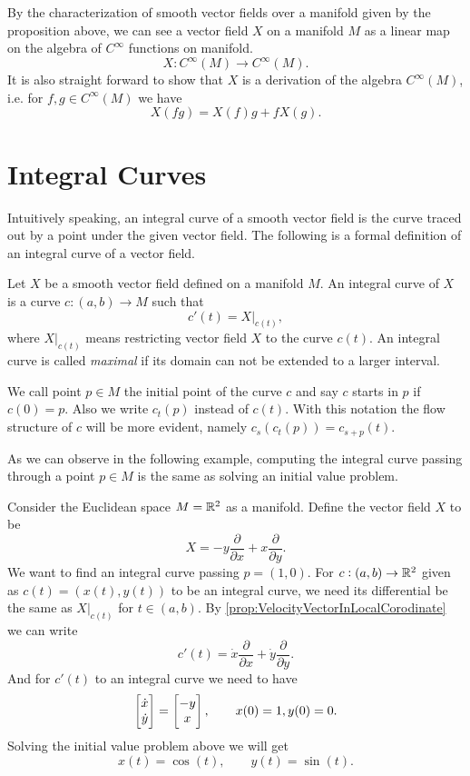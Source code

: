\begin{observation}
	By the characterization of smooth vector fields over a manifold given by the proposition above, we can see a vector field $ X $ on a manifold $ M $ as a linear map on the algebra of $ C^\infty $ functions on manifold.
	\[ X : C^\infty (M) \to C^\infty (M). \]
	It is also straight forward to show that $ X $ is a derivation of the algebra $ C^\infty (M) $, i.e. for $ f,g \in C^\infty (M) $ we have
	\[ X(fg)  = X(f)g + fX(g). \]
\end{observation}

\section{Integral Curves}
Intuitively speaking, an integral curve of a smooth vector field is the curve traced out by a point under the given vector field. The following is a formal definition of an integral curve of a vector field.

\begin{definition}
	\label{def:integralCurveOfAVectorField}
	Let $ X $ be a smooth vector field defined on a manifold $ M $. An integral curve of $ X $ is a curve $ c:(a,b) \to M $ such that 
	\[ c'(t) = X|_{c(t)},  \]
	where $ X|_{c(t)}  $ means restricting vector field $ X $ to the curve $ c(t) $. An integral curve is called \emph{maximal} if its domain can not be extended to a larger interval.
\end{definition}

\begin{remark}
	We call point $ p \in M $ the initial point of the curve $ c $ and say $ c $ starts in $ p $ if $ c(0) = p $. Also we write $ c_t(p) $ instead of $ c(t) $. With this notation the flow structure of $ c $ will be more evident, namely 
	$ c_s(c_t(p)) = c_{s+p}(t). $
\end{remark}

As we can observe in the following example, computing the integral curve passing through a point $ p \in M $ is the same as solving an initial value problem.

\begin{example}
	Consider the Euclidean space $ M = \mathbb{R}^2 $ as a manifold. Define the vector field $ X $ to be
	\[ X = -y \frac{\partial}{\partial x} + x\frac{\partial }{\partial y}. \]
	We want to find an integral curve passing $ p = (1,0) $. For $ c:(a,b) \to \mathbb{R}^2 $ given as $ c(t) = (x(t),y(t)) $ to be an integral curve, we need its differential be the same as $ X|_{c(t)}  $ for $ t \in (a,b) $. By \autoref{prop:VelocityVectorInLocalCorodinate} we can write
	\[ c'(t) = \dot{x} \frac{\partial }{\partial x} + \dot{y} \frac{\partial }{\partial y}. \]
	And for $ c'(t) $ to an integral curve we need to have
	\[ 
	\begin{bmatrix} \dot{x} \\ \dot{y} \end{bmatrix} = \begin{bmatrix} -y \\ x \end{bmatrix}, \qquad x(0) = 1, y(0) = 0.
	 \]
	Solving the initial value problem above we will get
	\[ x(t) = \cos (t), \qquad y(t) = \sin(t). \]
\end{example}


